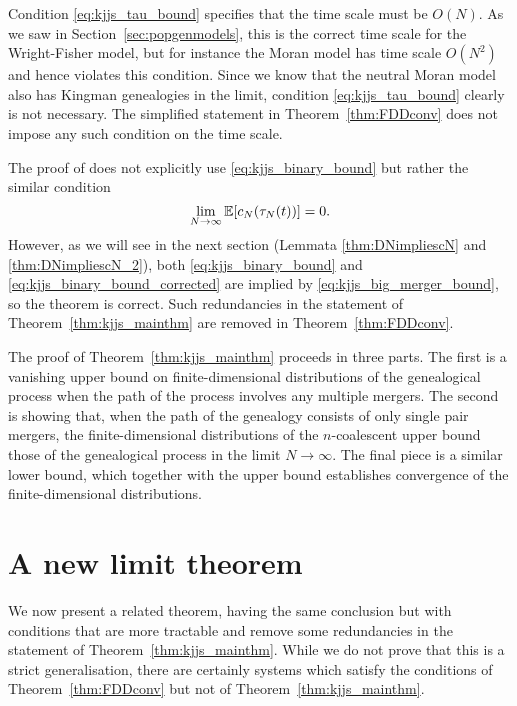 Condition \eqref{eq:kjjs_tau_bound} specifies that the time scale must be $O(N)$. As we saw in Section~\ref{sec:popgenmodels}, this is the correct time scale for the Wright-Fisher model, but for instance the Moran model has time scale $O(N^2)$ and hence violates this condition. 
Since we know that the neutral Moran model also has Kingman genealogies in the limit, condition \eqref{eq:kjjs_tau_bound} clearly is not necessary. 
The simplified statement in Theorem~\ref{thm:FDDconv} does not impose any such condition on the time scale.

The proof of \textcite{koskela2018} does not explicitly use \eqref{eq:kjjs_binary_bound} but rather the similar condition
\begin{equation}\label{eq:kjjs_binary_bound_corrected}
\lim_{ N \rightarrow \infty } \mathbb{E}[ c_N( \tau_N(t) ) ] = 0 .
\end{equation}
However, as we will see in the next section (Lemmata \ref{thm:DNimpliescN} and \ref{thm:DNimpliescN_2}), both \eqref{eq:kjjs_binary_bound} and \eqref{eq:kjjs_binary_bound_corrected} are implied by \eqref{eq:kjjs_big_merger_bound}, so the theorem is correct. 
Such redundancies in the statement of Theorem~\ref{thm:kjjs_mainthm} are removed in Theorem~\ref{thm:FDDconv}.


The proof of Theorem~\ref{thm:kjjs_mainthm} \parencite[i.e.][Theorem 1]{koskela2018} proceeds in three parts.
The first is a vanishing upper bound on finite-dimensional distributions of the genealogical process when the path of the process involves any multiple mergers.
The second is showing that, when the path of the genealogy consists of only single pair mergers, the finite-dimensional distributions of the $n$-coalescent upper bound those of the genealogical process in the limit $N\to\infty$.
The final piece is a similar lower bound, which together with the upper bound establishes convergence of the finite-dimensional distributions.




\section{A new limit theorem}
We now present a related theorem, having the same conclusion but with conditions that are more tractable and remove some redundancies in the statement of Theorem~\ref{thm:kjjs_mainthm}. 
While we do not prove that this is a strict generalisation, there are certainly systems which satisfy the conditions of Theorem~\ref{thm:FDDconv} but not of Theorem~\ref{thm:kjjs_mainthm}.

